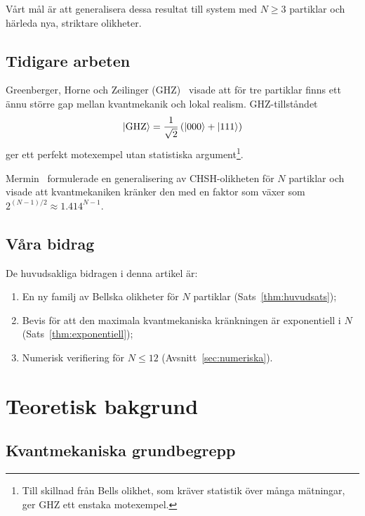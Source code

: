 \documentclass[12pt,a4paper]{article}
\theoremstyle{plain}
\theoremstyle{definition}
\theoremstyle{remark}
\begin{document}
V\r{a}rt m\r{a}l \"ar att generalisera dessa resultat till system
med $N \geq 3$ partiklar och h\"arleda nya, striktare olikheter.

\subsection{Tidigare arbeten}

Greenberger, Horne och Zeilinger (GHZ)~\citep{ghz1989} visade
att f\"or tre partiklar finns ett \"annu st\"orre gap mellan
kvantmekanik och lokal realism. GHZ-tillst\r{a}ndet
\begin{equation}
\label{eq:ghz}
\ket{\mathrm{GHZ}} = \frac{1}{\sqrt{2}} \left( \ket{000} + \ket{111} \right)
\end{equation}
ger ett perfekt motexempel utan statistiska argument\footnote{%
Till skillnad fr\r{a}n Bells olikhet, som kr\"aver statistik \"over
m\r{a}nga m\"atningar, ger GHZ ett enstaka motexempel.}.

Mermin~\citep{mermin1990} formulerade en generalisering av
CHSH-olikheten f\"or $N$ partiklar och visade att kvantmekaniken
kr\"anker den med en faktor som v\"axer som $2^{(N-1)/2} \approx 1.414^{N-1}$.

\subsection{V\r{a}ra bidrag}

De huvudsakliga bidragen i denna artikel \"ar:

\begin{enumerate}[label=(\roman*)]
  \item En ny familj av Bellska olikheter f\"or $N$ partiklar
        (Sats~\ref{thm:huvudsats});
  \item Bevis f\"or att den maximala kvantmekaniska kr\"ankningen
        \"ar exponentiell i $N$ (Sats~\ref{thm:exponentiell});
  \item Numerisk verifiering f\"or $N \leq 12$
        (Avsnitt~\ref{sec:numeriska}).
\end{enumerate}

\section{Teoretisk bakgrund}
\label{sec:bakgrund}

\subsection{Kvantmekaniska grundbegrepp}
\end{document}
